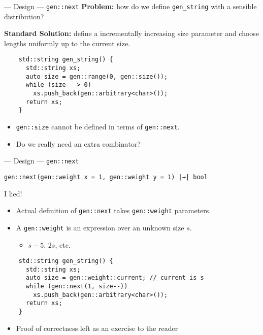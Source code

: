 \begin{frame}[fragile,t]{\halcheck{} --- Design --- \texttt{gen::next}}
  \textbf{Problem:} how do we define \texttt{gen_string} with a sensible distribution?

  \pause{}

  \textbf{Standard Solution:} define a incrementally increasing size parameter and choose lengths uniformly up to the current size.

  \begin{verbatim}
    std::string gen_string() {
      std::string xs;
      auto size = gen::range(0, gen::size());
      while (size-- > 0)
        xs.push_back(gen::arbitrary<char>());
      return xs;
    }
  \end{verbatim}

  \pause{}

  \begin{itemize}
    \item \texttt{gen::size} cannot be defined in terms of \texttt{gen::next}.
    \item Do we really need an extra combinator?
  \end{itemize}
\end{frame}

\begin{frame}[fragile,t]{\halcheck{} --- Design --- \texttt{gen::next}}
  \begin{center}
    \texttt{gen::next(gen::weight x = 1, gen::weight y = 1) |→| bool}
  \end{center}

  I lied! \pause{}
  \begin{itemize}
    \item Actual definition of \texttt{gen::next} takes \texttt{gen::weight} parameters.
    \item A \texttt{gen::weight} is an \alert{expression} over an unknown size $s$.
          \begin{itemize}
            \item $s - 5$, $2s$, etc.
          \end{itemize}
  \end{itemize}

  \begin{verbatim}
    std::string gen_string() {
      std::string xs;
      auto size = gen::weight::current; // current is s
      while (gen::next(1, size--))
        xs.push_back(gen::arbitrary<char>());
      return xs;
    }
  \end{verbatim}

  \begin{itemize}
    \item Proof of correctness left as an exercise to the reader \smiley{}
  \end{itemize}
\end{frame}

